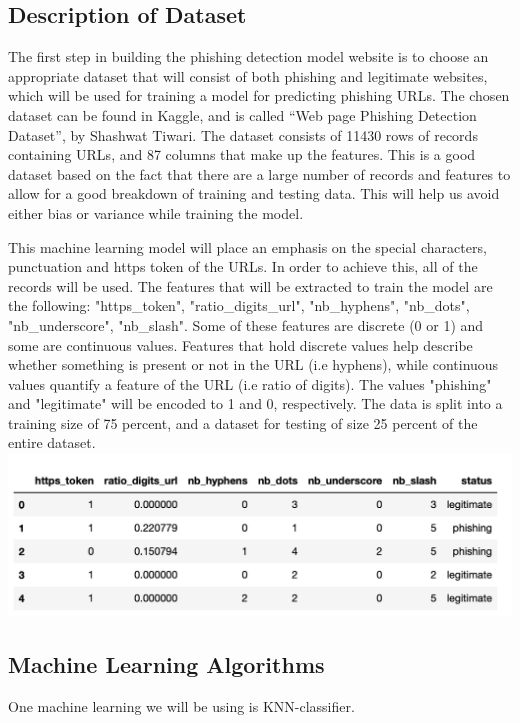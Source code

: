 \documentclass[conference]{IEEEtran}
\begin{document}
\subsection{Description of Dataset}
The first step in building the phishing detection model website is to choose an appropriate dataset that will consist of both phishing and legitimate websites, which will be used for training a model for predicting phishing URLs. The chosen dataset can be found in Kaggle, and is called  “Web page Phishing Detection Dataset”, by Shashwat Tiwari. The dataset consists of 11430 rows of records containing URLs, and 87 columns that make up the features. This is a good dataset based on the fact that there are a large number of records and features to allow for a good breakdown of training and testing data. This will help us avoid either bias or variance while training the model. 

This machine learning model will place an emphasis on the special characters, punctuation and https token of the URLs. In order to achieve this, all of the records will be used. The features that will be extracted to train the model are the following: "https_token", "ratio_digits_url", "nb_hyphens", "nb_dots", "nb_underscore", "nb_slash". Some of these features are discrete (0 or 1) and some are continuous values. Features that hold discrete values help describe whether something is present or not in the URL (i.e hyphens), while continuous values quantify a feature of the URL (i.e ratio of digits). The values "phishing" and "legitimate" will be encoded to 1 and 0, respectively. The data is split into a training size of 75 percent, and a dataset for testing of size 25 percent of the entire dataset.  
\includegraphics{dataset.png}

\subsection{Machine Learning Algorithms}
One machine learning we will be using is KNN-classifier. 
\end{document}
